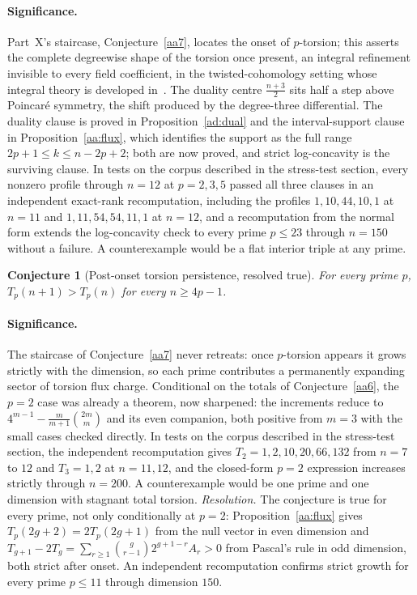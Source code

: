 \documentclass[11pt]{article}
\newtheorem{conjecture}{Conjecture}
\theoremstyle{definition}
\begin{document}
\paragraph{Significance.}
Part~X's staircase, Conjecture~\ref{aa7}, locates the onset of $p$-torsion; this asserts the complete degreewise shape of the torsion once present, an integral refinement invisible to every field coefficient, in the twisted-cohomology setting whose integral theory is developed in~\cite{LME24}.  The duality centre $\tfrac{n+3}2$ sits half a step above Poincar\'e symmetry, the shift produced by the degree-three differential.  The duality clause is proved in Proposition~\ref{ad:dual} and the interval-support clause in Proposition~\ref{aa:flux}, which identifies the support as the full range $2p+1\le k\le n-2p+2$; both are now proved, and strict log-concavity is the surviving clause.  In tests on the corpus described in the stress-test section, every nonzero profile through $n=12$ at $p=2,3,5$ passed all three clauses in an independent exact-rank recomputation, including the profiles $1,10,44,10,1$ at $n=11$ and $1,11,54,54,11,1$ at $n=12$, and a recomputation from the normal form extends the log-concavity check to every prime $p\le23$ through $n=150$ without a failure.  A counterexample would be a flat interior triple at any prime.

\begin{conjecture}[Post-onset torsion persistence, resolved true]\label{ad4}
For every prime $p$, $T_p(n+1)>T_p(n)$ for every $n\ge4p-1$.
\end{conjecture}

\paragraph{Significance.}
The staircase of Conjecture~\ref{aa7} never retreats: once $p$-torsion appears it grows strictly with the dimension, so each prime contributes a permanently expanding sector of torsion flux charge.  Conditional on the totals of Conjecture~\ref{aa6}, the $p=2$ case was already a theorem, now sharpened: the increments reduce to $4^{m-1}-\frac m{m+1}\binom{2m}m$ and its even companion, both positive from $m=3$ with the small cases checked directly.  In tests on the corpus described in the stress-test section, the independent recomputation gives $T_2=1,2,10,20,66,132$ from $n=7$ to $12$ and $T_3=1,2$ at $n=11,12$, and the closed-form $p=2$ expression increases strictly through $n=200$.  A counterexample would be one prime and one dimension with stagnant total torsion.  \emph{Resolution.} The conjecture is true for every prime, not only conditionally at $p=2$: Proposition~\ref{aa:flux} gives $T_p(2g+2)=2T_p(2g+1)$ from the null vector in even dimension and $T_{g+1}-2T_g=\sum_{r\ge1}\binom g{r-1}2^{g+1-r}A_r>0$ from Pascal's rule in odd dimension, both strict after onset.  An independent recomputation confirms strict growth for every prime $p\le11$ through dimension $150$.
\end{document}
